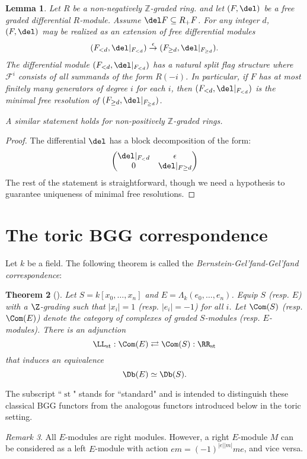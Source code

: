 \documentclass[12pt]{amsart}
\newtheorem{lemma}{Lemma}[section]
\newtheorem{thm}[lemma]{Theorem}
\theoremstyle{definition}
\theoremstyle{remark}
\newtheorem{rem}[lemma]{Remark}
\newcommand{\ZZ}{\mathbb Z}
\def\on{\operatorname}
\begin{document}
\begin{lemma}\label{lem:ZZ to flag}
Let $R$ be a non-negatively $\ZZ$-graded ring. and let $(F,\del)$ be a free graded differential $R$-module.  Assume $\del F\subseteq R_+F$.  For any integer $d$, $(F,\del)$ may be realized as an extension of free differential modules
\[
(F_{<d}, \del|_{F_{<d}}) \overset{\epsilon}{\to} (F_{\geq d}, \del|_{F_{\geq d}}).
\]
The differential module $(F_{<d}, \del|_{F_{<d}}) $ has a natural split flag structure where $\mathcal F^i$ consists of all summands of the form $R(-i)$.  In particular, if $F$ has at most finitely many generators of degree $i$ for each $i$, then $(F_{<d}, \del|_{F_{<d}}) $ is the minimal free resolution of $ (F_{\geq d}, \del|_{F_{\geq d}})$.

A similar statement holds for non-positively $\ZZ$-graded rings.
\end{lemma}
\begin{proof}
The differential $\del$ has a block decomposition of the form:
\[
\begin{pmatrix}
\del|_{F_<d} & \epsilon\\
0 & \del|_{F\geq d}
\end{pmatrix}
\]
The rest of the statement is straightforward, though we need a hypothesis to guarantee uniqueness of minimal free resolutions.
\end{proof}
\section{The toric BGG correspondence}

Let $k$ be a field. The following theorem is called the \emph{Bernstein-Gel'fand-Gel'fand correspondence}:

\begin{thm}[\cite{BGG}] 
Let $S = k[x_0, \dots, x_n]$ and $E = \Lambda_k(e_0, \dots, e_n)$. Equip $S$ (resp. $E$) with a $\Z$-grading such that $|x_i| = 1$ (resp. $|e_i| = -1$) for all $i$. Let $\Com(S)$ (resp. $\Com(E)$) denote the category of complexes of graded $S$-modules (resp. $E$-modules). There is an adjunction 
$$
\LL_{\on{st}} : \Com(E) \rightleftarrows \Com(S) : \RR_{\on{st}} 
$$
that induces an equivalence
$$
\Db(E) \simeq \Db(S).
$$
\end{thm}
The subscript ``$\on{st}$" stands for ``standard" and is intended to distinguish these classical BGG functors from the analogous functors introduced below in the toric setting.

\begin{rem}
All $E$-modules are right modules. However, a right $E$-module $M$ can be considered as a left $E$-module with action $em = (-1)^{|e||m|}me$, and vice versa.
\end{rem}
\end{document}
